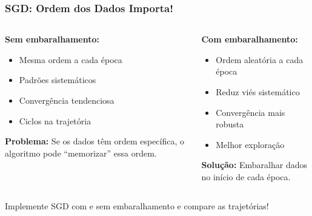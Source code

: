 \documentclass[xcolor=dvipsnames,t,aspectratio=169]{beamer} %
\begin{document}
\begin{frame}
    \frametitle{SGD: Ordem dos Dados Importa!}
    
    \begin{columns}[c]
        \begin{column}{0.5\textwidth}
            \textbf{Sem embaralhamento:}
            \begin{itemize}
                \item Mesma ordem a cada época
                \item Padrões sistemáticos
                \item Convergência tendenciosa
                \item Ciclos na trajetória
            \end{itemize}
            
            \textbf{Problema:} Se os dados têm ordem específica, o algoritmo pode ``memorizar'' essa ordem.
        \end{column}
        \begin{column}{0.5\textwidth}
            \textbf{Com embaralhamento:}
            \begin{itemize}
                \item Ordem aleatória a cada época
                \item Reduz viés sistemático
                \item Convergência mais robusta
                \item Melhor exploração
            \end{itemize}
            
            \textbf{Solução:} Embaralhar dados no início de cada época.
        \end{column}
    \end{columns}
    
    \vspace{0.5cm}
    \begin{attention}
        Implemente SGD com e sem embaralhamento e compare as trajetórias!
    \end{attention}
\end{frame}
\end{document}
